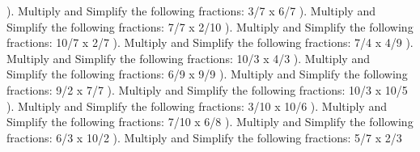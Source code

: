 \documentclass{article}%
\begin{document}
\newline%
). Multiply and Simplify the following fractions: 3/7 x 6/7%
\newline%
\newline%
). Multiply and Simplify the following fractions: 7/7 x 2/10%
\newline%
\newline%
). Multiply and Simplify the following fractions: 10/7 x 2/7%
\newline%
\newline%
). Multiply and Simplify the following fractions: 7/4 x 4/9%
\newline%
\newline%
). Multiply and Simplify the following fractions: 10/3 x 4/3%
\newline%
\newline%
). Multiply and Simplify the following fractions: 6/9 x 9/9%
\newline%
\newline%
). Multiply and Simplify the following fractions: 9/2 x 7/7%
\newline%
\newline%
). Multiply and Simplify the following fractions: 10/3 x 10/5%
\newline%
\newline%
). Multiply and Simplify the following fractions: 3/10 x 10/6%
\newline%
\newline%
). Multiply and Simplify the following fractions: 7/10 x 6/8%
\newline%
\newline%
). Multiply and Simplify the following fractions: 6/3 x 10/2%
\newline%
\newline%
). Multiply and Simplify the following fractions: 5/7 x 2/3%
\newline%
\newline%
\end{document}
